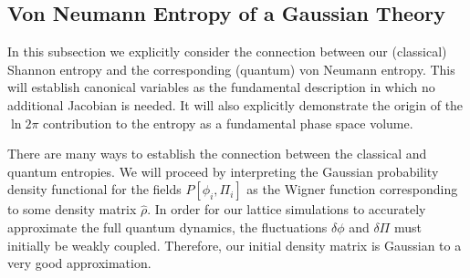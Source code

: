 \documentclass[11pt,a4paper]{article}
\begin{document}
\subsection{Von Neumann Entropy of a Gaussian Theory}
\label{sec:vn_entropy}
In this subsection we explicitly consider the connection between our (classical) Shannon entropy and the corresponding (quantum) von Neumann entropy.
This will establish canonical variables as the fundamental description in which no additional Jacobian is needed.
It will also explicitly demonstrate the origin of the $\ln 2\pi$ contribution to the entropy as a fundamental phase space volume.

There are many ways to establish the connection between the classical and quantum entropies.  
We will proceed by interpreting the Gaussian probability density functional for the fields $P[\phi_i,\Pi_i]$ as the Wigner function corresponding to some density matrix $\hat{\rho}$.
In order for our lattice simulations to accurately approximate the full quantum dynamics, the fluctuations $\delta\phi$ and $\delta\Pi$ must initially be weakly coupled.
Therefore, our initial density matrix is Gaussian to a very good approximation.
\end{document}
